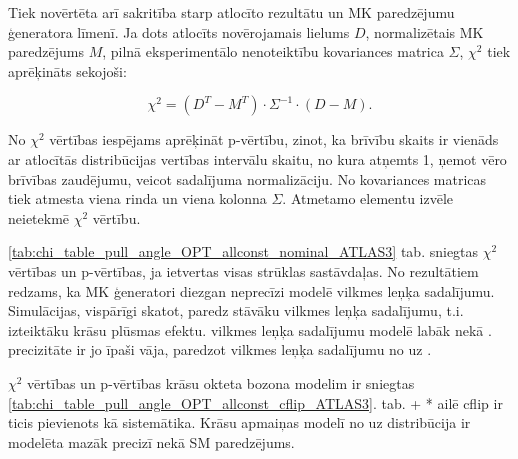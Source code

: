 Tiek novērtēta arī sakritība starp atlocīto rezultātu un MK paredzējumu ģeneratora līmenī. Ja dots atlocīts novērojamais lielums $D$, normalizētais MK paredzējums $M$, pilnā eksperimentālo nenoteiktību kovariances matrica $\Sigma$, $\chi^{2}$ tiek aprēķināts sekojoši:

\begin{equation}
  \chi^{2}=(D^{T}-M^{T})\cdot\Sigma^{-1}\cdot(D-M).
  \label{eq:chi2}
\end{equation}

No $\chi^{2}$ vērtības iespējams aprēķināt p-vērtību, zinot, ka brīvību skaits ir vienāds ar atlocītās distribūcijas vertības intervālu skaitu, no kura atņemts 1, ņemot vēro brīvības zaudējumu, veicot sadalījuma normalizāciju. No kovariances matricas tiek atmesta viena rinda un viena kolonna $\Sigma$. Atmetamo elementu izvēle neietekmē $\chi^{2}$ vērtību.

\ref{tab:chi_table_pull_angle_OPT_allconst_nominal_ATLAS3} tab. sniegtas \pullangle  $\chi^{2}$ vērtības un p-vērtības, ja ietvertas visas strūklas sastāvdaļas. No rezultātiem redzams, ka MK ģeneratori diezgan neprecīzi modelē vilkmes leņķa sadalījumu. Simulācijas, vispārīgi skatot, paredz stāvāku vilkmes leņķa sadalījumu, t.i. izteiktāku krāsu plūsmas efektu. \HERWIGpp vilkmes leņķa sadalījumu modelē labāk nekā .  precizitāte ir jo īpaši vāja, paredzot vilkmes leņķa sadalījumu no \scndleadingjet uz \leadingjet.

$\chi^{2}$ vērtības un p-vērtības krāsu okteta \PW bozona modelim ir sniegtas \ref{tab:chi_table_pull_angle_OPT_allconst_cflip_ATLAS3}. tab. \POWHEG+ * ailē \ttbar cflip ir ticis pievienots kā \ttbar sistemātika. Krāsu apmaiņas modelī \pullangle no \leadingjet uz \scndleadingjet distribūcija ir modelēta mazāk precizī nekā SM paredzējums. 
  







%

